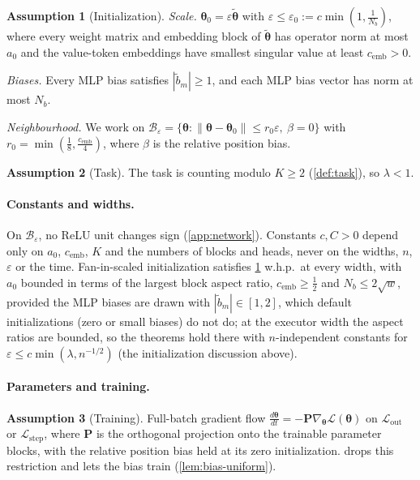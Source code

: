 \documentclass[11pt]{article}
\theoremstyle{definition}
\newtheorem{assumption}{Assumption}
\theoremstyle{remark}
\newcommand{\Lout}{\mathcal L_{\mathrm{out}}}
\newcommand{\Lstep}{\mathcal L_{\mathrm{step}}}
\newcommand{\initscale}{\varepsilon}
\newcommand{\ballradius}{r_0}
\newcommand{\mixrate}{\lambda}
\newcommand{\initball}{\mathcal B_{\initscale}}
\newcommand{\embconst}{c_{\mathrm{emb}}}
\begin{document}
\begin{assumption}[Initialization]
\label{ass:init}
\emph{Scale.} $\bm\theta_0=\initscale\tilde{\bm\theta}$ with $\initscale\le\initscale_0:=c\min(1,\frac{1}{N_b})$, where every weight matrix and embedding block of $\tilde{\bm\theta}$ has operator norm
at most $a_0$ and the value-token embeddings have smallest singular value at least $\embconst>0$.

\emph{Biases.} Every MLP bias satisfies $|\tilde b_m|\ge1$, and each MLP bias vector has norm at most $N_b$.

\emph{Neighbourhood.} We work on
$\initball=\{\bm\theta:\|\bm\theta-\bm\theta_0\|\le\ballradius\initscale,\ \beta=0\}$ with $\ballradius=\min(\frac{1}{8},\frac{\embconst}{4})$, where $\beta$ is the
relative position bias.
\end{assumption}

\begin{assumption}[Task]
\label{ass:task}
The task is counting modulo $K\ge2$ (\cref{def:task}), so $\mixrate<1$.
\end{assumption}

\paragraph{Constants and widths.} On $\initball$, no ReLU unit changes sign (\cref{app:network}). Constants $c,C>0$ depend only on $a_0$, $\embconst$, $K$
and the numbers of blocks and heads, never on the widths, $n$, $\initscale$ or the time. Fan-in-scaled initialization
satisfies \cref{ass:init} w.h.p.\ at every width, with $a_0$ bounded in terms of the largest block aspect ratio,
$\embconst\ge\tfrac{1}{2}$ and $N_b\le2\sqrt w$, provided the MLP biases are drawn with $|\tilde b_m|\in[1,2]$, which default
initializations (zero or small biases) do not do; at the executor width the aspect ratios are bounded, so the theorems
hold there with $n$-independent constants for $\initscale\le c\min(\mixrate,n^{-1/2})$ (the initialization discussion above).

\paragraph{Parameters and training.}

\begin{assumption}[Training]
\label{ass:gd}
Full-batch gradient flow $\tfrac{d\bm\theta}{dt}=-\mathbf P\nabla_{\bm\theta}\mathcal L(\bm\theta)$ on $\Lout$ or $\Lstep$, where $\mathbf P$ is the orthogonal projection onto
the trainable parameter blocks, with the relative
position bias held at its zero initialization.  drops this restriction and lets the bias train (\cref{lem:bias-uniform}).
\end{assumption}
\end{document}

